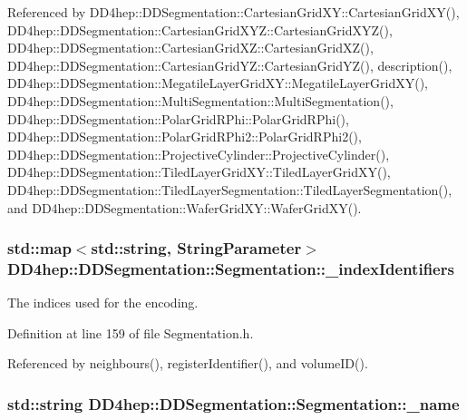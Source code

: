 Referenced by DD4hep::DDSegmentation::CartesianGridXY::CartesianGridXY(), DD4hep::DDSegmentation::CartesianGridXYZ::CartesianGridXYZ(), DD4hep::DDSegmentation::CartesianGridXZ::CartesianGridXZ(), DD4hep::DDSegmentation::CartesianGridYZ::CartesianGridYZ(), description(), DD4hep::DDSegmentation::MegatileLayerGridXY::MegatileLayerGridXY(), DD4hep::DDSegmentation::MultiSegmentation::MultiSegmentation(), DD4hep::DDSegmentation::PolarGridRPhi::PolarGridRPhi(), DD4hep::DDSegmentation::PolarGridRPhi2::PolarGridRPhi2(), DD4hep::DDSegmentation::ProjectiveCylinder::ProjectiveCylinder(), DD4hep::DDSegmentation::TiledLayerGridXY::TiledLayerGridXY(), DD4hep::DDSegmentation::TiledLayerSegmentation::TiledLayerSegmentation(), and DD4hep::DDSegmentation::WaferGridXY::WaferGridXY().\hypertarget{class_d_d4hep_1_1_d_d_segmentation_1_1_segmentation_a55ce2740cffa420bb5ac2b7646e55d98}{
\subsubsection[{\_\-indexIdentifiers}]{\setlength{\rightskip}{0pt plus 5cm}std::map$<$std::string, {\bf StringParameter}$>$ {\bf DD4hep::DDSegmentation::Segmentation::\_\-indexIdentifiers}}}
\label{class_d_d4hep_1_1_d_d_segmentation_1_1_segmentation_a55ce2740cffa420bb5ac2b7646e55d98}


The indices used for the encoding. 

Definition at line 159 of file Segmentation.h.

Referenced by neighbours(), registerIdentifier(), and volumeID().\hypertarget{class_d_d4hep_1_1_d_d_segmentation_1_1_segmentation_aa129e659e465d9a0a60c7160d29de483}{
\subsubsection[{\_\-name}]{\setlength{\rightskip}{0pt plus 5cm}std::string {\bf DD4hep::DDSegmentation::Segmentation::\_\-name}}}
\label{class_d_d4hep_1_1_d_d_segmentation_1_1_segmentation_aa129e659e465d9a0a60c7160d29de483}



